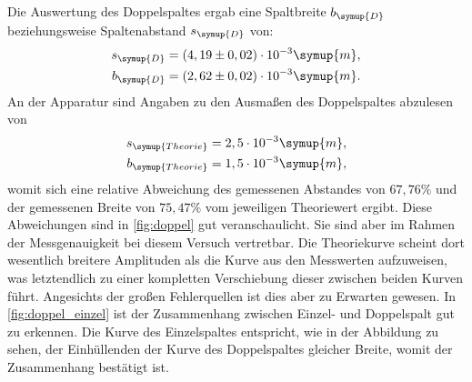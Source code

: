 Die Auswertung des Doppelspaltes ergab eine Spaltbreite $b_{\symup{D}}$ beziehungsweise Spaltenabstand $s_{\symup{D}}$ von:
\begin{align*}
    s_{\symup{D}} = (4,19 \pm 0,02) \cdot 10^{-3} \symup{m}, \\
    b_{\symup{D}} = (2,62 \pm 0,02) \cdot 10^{-3} \symup{m}.
\end{align*}
An der Apparatur sind Angaben zu den Ausmaßen des Doppelspaltes abzulesen von
 \begin{align*}
        s_{\symup{Theorie}} = 2,5 \cdot 10^{-3} \symup{m}, \\
        b_{\symup{Theorie}} = 1,5 \cdot 10^{-3} \symup{m},
 \end{align*}
womit sich eine relative Abweichung des gemessenen Abstandes von $67,76 \%$ und der gemessenen Breite von $75,47\%$ vom jeweiligen Theoriewert
ergibt. Diese Abweichungen sind in \autoref{fig:doppel} gut veranschaulicht. Sie sind aber im Rahmen der Messgenauigkeit bei diesem Versuch
vertretbar. Die Theoriekurve scheint dort wesentlich breitere
Amplituden als die Kurve aus den Messwerten aufzuweisen, was letztendlich zu einer kompletten Verschiebung dieser zwischen beiden Kurven führt.
Angesichts der großen Fehlerquellen ist dies aber zu Erwarten gewesen. In \autoref{fig:doppel_einzel} ist der Zusammenhang zwischen Einzel- und 
Doppelspalt gut zu erkennen. Die Kurve des Einzelspaltes entspricht, wie in der Abbildung zu sehen, der Einhüllenden der Kurve des Doppelspaltes 
gleicher Breite, womit der Zusammenhang bestätigt ist.